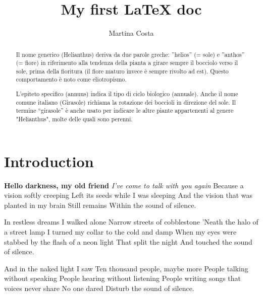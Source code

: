 \documentclass[12pt]{article} %
\title{My first LaTeX doc} %
\author{Martina Costa}
\begin{document}
\maketitle %

\begin{abstract} %
    Il nome generico (Helianthus) deriva da due parole greche: ”helios” (= sole) e ”anthos” (= fiore) in riferimento alla tendenza della pianta a girare sempre il bocciolo verso il sole, 
    prima della fioritura (il fiore maturo invece è sempre rivolto ad est). Questo comportamento è noto come eliotropismo.

L'epiteto specifico (annuus) indica il tipo di ciclo biologico (annuale). Anche il nome comune italiano (Girasole) richiama la rotazione dei boccioli in direzione del sole. 
Il termine “girasole” è anche usato per indicare le altre piante appartenenti al genere "Helianthus", molte delle quali sono perenni.
\end{abstract}

\tableofcontents %

\section{Introduction} \label{sec:intro} %
\textbf{Hello darkness, my old friend} %
\textit{I've come to talk with you again} %
Because a vision softly creeping
Left its seeds while I was sleeping
And the vision that was planted in my brain
Still remains
Within the sound of silence.

\bigskip %

In restless dreams I walked alone
Narrow streets of cobblestone
'Neath the halo of a street lamp
I turned my collar to the cold and damp
When my eyes were stabbed by the flash of a neon light
That split the night
And touched the sound of silence.

\smallskip %

And in the naked light I saw
Ten thousand people, maybe more
People talking without speaking
People hearing without listening
People writing songs that voices never share
No one dared
Disturb the sound of silence.
\end{document}
